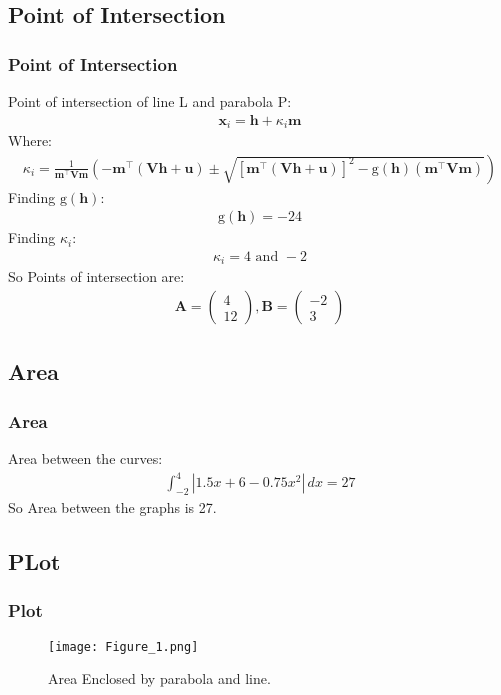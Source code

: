 \documentclass{beamer}
\providecommand{\sbrak}[1]{\ensuremath{{}\left[#1\right]}}
\providecommand{\brak}[1]{\ensuremath{\left(#1\right)}}
\providecommand{\lbrak}[1]{\ensuremath{\left(#1\right.}}
\providecommand{\rbrak}[1]{\ensuremath{\left.#1\right)}}
\theoremstyle{remark}
\providecommand{\abs}[1]{\left\vert#1\right\vert}
\newcommand{\myvec}[1]{\ensuremath{\begin{pmatrix}#1\end{pmatrix}}}
\let\vec\mathbf
\numberwithin{equation}{section}
\begin{document}
\subsection{Point of Intersection}
\begin{frame}
\frametitle{Point of Intersection}
Point of intersection of line L and parabola P:
\begin{align}
	\vec{x}_i = \vec{h} + \kappa_i \vec{m}
\end{align}
Where:
\begin{align}
	\kappa_i = \frac{1}
{
\vec{m}^{\top}\vec{V}\vec{m}
}
\lbrak{-\vec{m}^{\top}\brak{\vec{V}\vec{h}+\vec{u}}}
\pm
\rbrak{\sqrt{
\sbrak{
\vec{m}^{\top}\brak{\vec{V}\vec{h}+\vec{u}}
}^2
	-\text{g}
\brak
{\vec{h}
}
\brak{\vec{m}^{\top}\vec{V}\vec{m}}
}
}
\end{align}
Finding $\text{g}\brak{\vec{h}}$:
\begin{align}
	\text{g}\brak{\vec{h}}=-24
\end{align}
Finding $\kappa_i$:
\begin{align}
	\kappa_i=4 \text{ and } -2
\end{align}
So Points of intersection are:
\begin{align}
 \vec{A}=\myvec{4\\12} , \vec{B}=\myvec{-2\\3}
\end{align}
\end{frame}
\subsection{Area}
\begin{frame}
\frametitle{Area}

Area between the curves:
\begin{align}
     \int_{-2}^{4}\abs{1.5x+6-0.75x^2}\,dx =27
\end{align}
So Area between the graphs is 27.\\



\end{frame}


\subsection{PLot}
\begin{frame}[fragile]
\frametitle{Plot}

\begin{figure}[h!]
   \centering
   \texttt{[image: Figure\_1.png]}
	\caption{Area Enclosed by parabola and line. }
   \label{stemplot}
\end{figure}
\end{frame}
\end{document}
